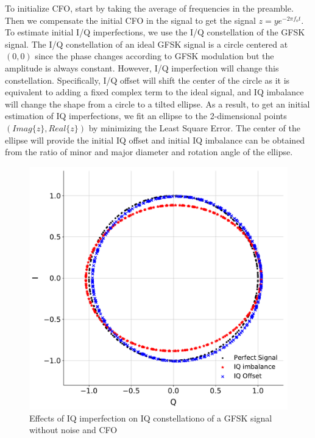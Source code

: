 To initialize CFO, start by taking the average of frequencies in the preamble. Then we compensate the initial CFO in the signal to get the signal $z = y e^{-2\pi f_o t}$. To estimate initial I/Q imperfections, we use the I/Q constellation of the GFSK signal. The I/Q constellation of an ideal GFSK signal is a circle centered at $(0,0)$ since the phase changes according to GFSK modulation but the amplitude is always constant. However, I/Q imperfection will change this constellation. Specifically, I/Q offset will shift the center of the circle as it is equivalent to adding a fixed complex term to the ideal signal, and IQ imbalance will change the shape from a circle to a tilted ellipse.
%
As a result, to get an initial estimation of IQ imperfections, we fit an ellipse to the 2-dimensional points $(Imag\{z\},Real\{z\})$ by minimizing the Least Square Error. The center of the ellipse will provide the initial IQ offset and initial IQ imbalance can be obtained from the ratio of minor and major diameter and rotation angle of the ellipse.\\

\begin{figure}[t!]
    \centering
    \includegraphics[width = \linewidth]{plots/IQ_const.pdf} 
    \caption{Effects of IQ imperfection on IQ constellationo of a GFSK signal without noise and CFO}
    \label{fig:iq_const}
\end{figure}
\fi

